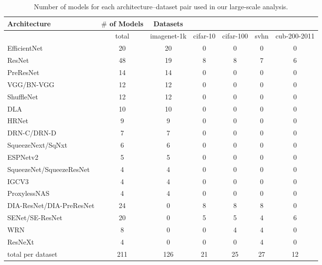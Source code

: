 
\begin{table}[t]
\small
\begin{center}
\begin{tabular}{|l|c|c|c|c|c|c|}
\hline
Architecture & $\#$ of Models & Datasets & & & & \\
\hline

  & total &imagenet-1k & cifar-10 & cifar-100 & svhn & cub-200-2011 \\
\hline
EfficientNet & 20 &20 & 0 & 0 & 0 & 0 \\
ResNet & 48 &19 & 8 & 8 & 7 & 6 \\
PreResNet & 14 &14 & 0 & 0 & 0 & 0 \\
VGG/BN-VGG & 12 &12 & 0 & 0 & 0 & 0 \\
ShuffleNet & 12 &12 & 0 & 0 & 0 & 0 \\
DLA & 10 &10 & 0 & 0 & 0 & 0 \\
HRNet & 9 &9 & 0 & 0 & 0 & 0 \\
DRN-C/DRN-D & 7 &7 & 0 & 0 & 0 & 0 \\
SqueezeNext/SqNxt & 6 &6 & 0 & 0 & 0 & 0 \\
ESPNetv2 & 5 &5 & 0 & 0 & 0 & 0 \\
SqueezeNet/SqueezeResNet & 4 &4 & 0 & 0 & 0 & 0 \\
IGCV3 & 4 &4 & 0 & 0 & 0 & 0 \\
ProxylessNAS & 4 &4 & 0 & 0 & 0 & 0 \\
DIA-ResNet/DIA-PreResNet & 24 &0 & 8 & 8 & 8 & 0 \\
SENet/SE-ResNet & 20 &0 & 5 & 5 & 4 & 6 \\
WRN & 8 &0 & 0 & 4 & 4 & 0 \\
ResNeXt & 4 &0 & 0 & 0 & 4 & 0 \\
\hline
total per dataset & 211 &  126 & 21 & 25 & 27 & 12 \\
\hline

\hline
\end{tabular}
\end{center}
\caption{Number of models for each architecture--dataset pair used in our large-scale analysis.}
\label{table:reaults}
\end{table}

